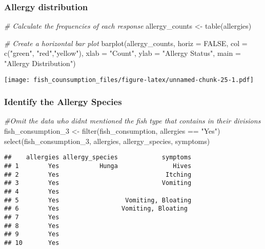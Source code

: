 \documentclass[
]{article}
\newenvironment{Shaded}{\begin{snugshade}}{\end{snugshade}}
\newcommand{\AttributeTok}[1]{\textcolor[rgb]{0.77,0.63,0.00}{#1}}
\newcommand{\CommentTok}[1]{\textcolor[rgb]{0.56,0.35,0.01}{\textit{#1}}}
\newcommand{\ConstantTok}[1]{\textcolor[rgb]{0.00,0.00,0.00}{#1}}
\newcommand{\FunctionTok}[1]{\textcolor[rgb]{0.00,0.00,0.00}{#1}}
\newcommand{\NormalTok}[1]{#1}
\newcommand{\OtherTok}[1]{\textcolor[rgb]{0.56,0.35,0.01}{#1}}
\newcommand{\SpecialCharTok}[1]{\textcolor[rgb]{0.00,0.00,0.00}{#1}}
\newcommand{\StringTok}[1]{\textcolor[rgb]{0.31,0.60,0.02}{#1}}
\begin{document}
\hypertarget{allergy-distribution}{%
\subsubsection{Allergy distribution}\label{allergy-distribution}}

\begin{Shaded}
\begin{Highlighting}[]
\CommentTok{\# Calculate the frequencies of each response}
\NormalTok{allergy\_counts }\OtherTok{\textless{}{-}} \FunctionTok{table}\NormalTok{(allergies)}

\CommentTok{\# Create a horizontal bar plot}
\FunctionTok{barplot}\NormalTok{(allergy\_counts, }\AttributeTok{horiz =} \ConstantTok{FALSE}\NormalTok{, }\AttributeTok{col =} \FunctionTok{c}\NormalTok{(}\StringTok{"green"}\NormalTok{, }\StringTok{"red"}\NormalTok{,}\StringTok{"yellow"}\NormalTok{),}
        \AttributeTok{xlab =} \StringTok{"Count"}\NormalTok{, }\AttributeTok{ylab =} \StringTok{"Allergy Status"}\NormalTok{, }\AttributeTok{main =} \StringTok{"Allergy Distribution"}\NormalTok{)}
\end{Highlighting}
\end{Shaded}

\texttt{[image: fish\_counsumption\_files/figure-latex/unnamed-chunk-25-1.pdf]}

\hypertarget{identify-the-allergy-species}{%
\subsubsection{Identify the Allergy
Species}\label{identify-the-allergy-species}}

\begin{Shaded}
\begin{Highlighting}[]
\CommentTok{\#Omit the data who didn\textquotesingle{}t mentioned the fish type that contains in their divisions}
\NormalTok{fish\_consumption\_3 }\OtherTok{\textless{}{-}} \FunctionTok{filter}\NormalTok{(fish\_consumption, allergies }\SpecialCharTok{==} \StringTok{"Yes"}\NormalTok{)}
                    \FunctionTok{select}\NormalTok{(fish\_consumption\_3, allergies, allergy\_species, symptoms)}
\end{Highlighting}
\end{Shaded}

\begin{verbatim}
##    allergies allergy_species            symptoms
## 1        Yes           Hunga               Hives
## 2        Yes                             Itching
## 3        Yes                            Vomiting
## 4        Yes                                    
## 5        Yes                  Vomiting, Bloating
## 6        Yes                 Vomiting, Bloating 
## 7        Yes                                    
## 8        Yes                                    
## 9        Yes                                    
## 10       Yes
\end{verbatim}
\end{document}
